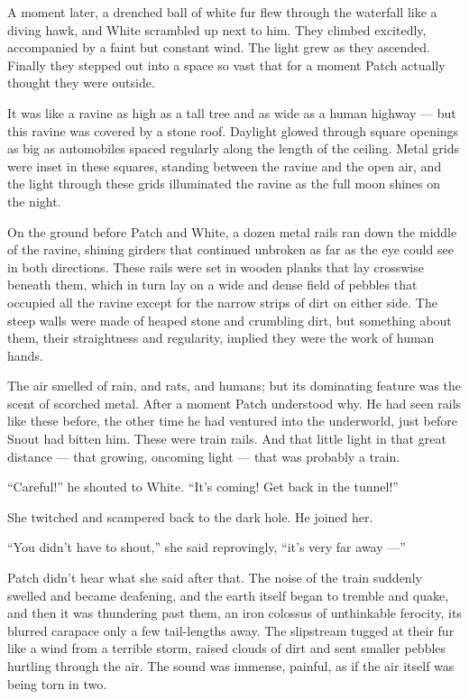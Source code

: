 \documentclass[ebook,oneside,openany,12pt]{memoir}
\begin{document}
A moment later, a drenched ball of white fur flew through the
waterfall like a diving hawk, and White scrambled up next to him. They
climbed excitedly, accompanied by a faint but constant wind. The light
grew as they ascended. Finally they stepped out into a space so vast
that for a moment Patch actually thought they were outside.

It was like a ravine as high as a tall tree and as wide as a human
highway — but this ravine was covered by a stone roof. Daylight glowed
through square openings as big as automobiles spaced regularly along
the length of the ceiling. Metal grids were inset in these squares,
standing between the ravine and the open air, and the light through
these grids illuminated the ravine as the full moon shines on the
night.

On the ground before Patch and White, a dozen metal rails ran down the
middle of the ravine, shining girders that continued unbroken as far
as the eye could see in both directions. These rails were set in
wooden planks that lay crosswise beneath them, which in turn lay on a
wide and dense field of pebbles that occupied all the ravine except
for the narrow strips of dirt on either side. The steep walls were
made of heaped stone and crumbling dirt, but something about them,
their straightness and regularity, implied they were the work of human
hands.

The air smelled of rain, and rats, and humans; but its dominating
feature was the scent of scorched metal. After a moment Patch
understood why. He had seen rails like these before, the other time he
had ventured into the underworld, just before Snout had bitten
him. These were train rails. And that little light in that great
distance — that growing, oncoming light — that was probably a train.

“Careful!” he shouted to White. “It’s coming! Get back in the tunnel!”

She twitched and scampered back to the dark hole. He joined her.

“You didn’t have to shout,” she said reprovingly, “it’s very far away
—”

Patch didn’t hear what she said after that. The noise of the train
suddenly swelled and became deafening, and the earth itself began to
tremble and quake, and then it was thundering past them, an iron
colossus of unthinkable ferocity, its blurred carapace only a few
tail-lengths away. The slipstream tugged at their fur like a wind from
a terrible storm, raised clouds of dirt and sent smaller pebbles
hurtling through the air. The sound was immense, painful, as if the
air itself was being torn in two.
\end{document}
